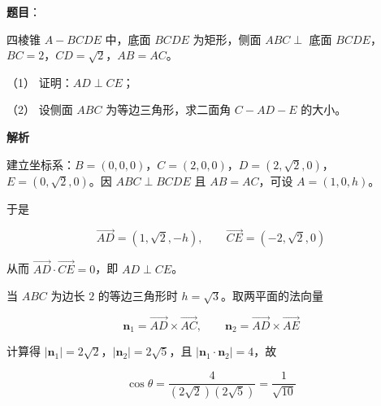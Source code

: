 \begin{answer}

\textbf{题目}：

四棱锥 $A-BCDE$ 中，底面 $BCDE$ 为矩形，侧面 $ABC\perp$ 底面 $BCDE$，$BC=2$，$CD=\sqrt2$，$AB=AC$。
\nopagebreak[4]
\begin{center}\end{center}
\nopagebreak[4]
（1） 证明：$AD\perp CE$；

（2） 设侧面 $ABC$ 为等边三角形，求二面角 $C-AD-E$ 的大小。

\textbf{解析}


建立坐标系：$B=(0,0,0)$，$C=(2,0,0)$，$D=(2,\sqrt2,0)$，$E=(0,\sqrt2,0)$。因 $ABC\perp BCDE$ 且 $AB=AC$，可设 $A=(1,0,h)$。

于是

\nopagebreak[4]
\[
\overrightarrow{AD}=(1,\sqrt2,-h),\qquad
\overrightarrow{CE}=(-2,\sqrt2,0)
\]

从而 $\overrightarrow{AD}\cdot\overrightarrow{CE}=0$，即 $AD\perp CE$。


当 $ABC$ 为边长 $2$ 的等边三角形时 $h=\sqrt3$。取两平面的法向量

\nopagebreak[4]
\[
\boldsymbol n_1=\overrightarrow{AD}\times\overrightarrow{AC},\qquad
\boldsymbol n_2=\overrightarrow{AD}\times\overrightarrow{AE}
\]

计算得 $|\boldsymbol n_1|=2\sqrt2$，$|\boldsymbol n_2|=2\sqrt5$，且 $|\boldsymbol n_1\cdot\boldsymbol n_2|=4$，故

\nopagebreak[4]
\[
\cos\theta=\frac4{(2\sqrt2)(2\sqrt5)}=\frac1{\sqrt{10}}
\]



\end{answer}
